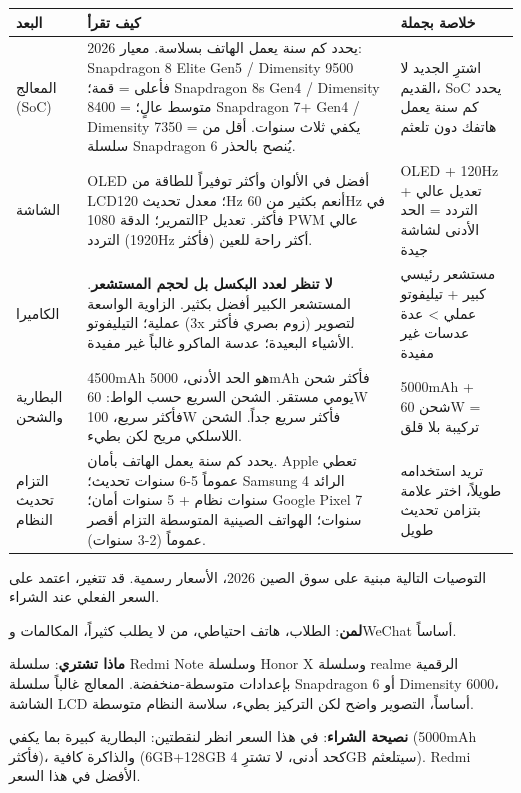\begin{center}
\begin{tabularx}{\linewidth}{|X|X|X|}
\hline
\textbf{البعد} & \textbf{كيف تقرأ} & \textbf{خلاصة بجملة} \tabularnewline
\hline
المعالج (SoC) & يحدد كم سنة يعمل الهاتف بسلاسة. معيار 2026: Snapdragon 8 Elite Gen5 / Dimensity 9500 فأعلى = قمة؛ Snapdragon 8s Gen4 / Dimensity 8400 = متوسط عالٍ؛ Snapdragon 7+ Gen4 / Dimensity 7350 = يكفي ثلاث سنوات. أقل من سلسلة Snapdragon 6 يُنصح بالحذر. & اشترِ الجديد لا القديم، SoC يحدد كم سنة يعمل هاتفك دون تلعثم \tabularnewline
الشاشة & OLED أفضل في الألوان وأكثر توفيراً للطاقة من LCD؛ معدل تحديث 120Hz أنعم بكثير من 60Hz في التمرير؛ الدقة 1080P فأكثر. تعديل PWM عالي التردد (1920Hz فأكثر) أكثر راحة للعين. & OLED + 120Hz + تعديل عالي التردد = الحد الأدنى لشاشة جيدة \tabularnewline
الكاميرا & \textbf{لا تنظر لعدد البكسل بل لحجم المستشعر}. المستشعر الكبير أفضل بكثير. الزاوية الواسعة عملية؛ التيليفوتو (3x زوم بصري فأكثر) لتصوير الأشياء البعيدة؛ عدسة الماكرو غالباً غير مفيدة. & مستشعر رئيسي كبير + تيليفوتو عملي > عدة عدسات غير مفيدة \tabularnewline
البطارية والشحن & 4500mAh هو الحد الأدنى، 5000mAh فأكثر شحن يومي مستقر. الشحن السريع حسب الواط: 60W فأكثر سريع، 100W فأكثر سريع جداً. الشحن اللاسلكي مريح لكن بطيء. & 5000mAh + شحن 60W = تركيبة بلا قلق \tabularnewline
التزام تحديث النظام & يحدد كم سنة يعمل الهاتف بأمان. Apple تعطي عموماً 5-6 سنوات تحديث؛ Samsung الرائد 4 سنوات نظام + 5 سنوات أمان؛ Google Pixel 7 سنوات؛ الهواتف الصينية المتوسطة التزام أقصر عموماً (2-3 سنوات). & تريد استخدامه طويلاً، اختر علامة بتزامن تحديث طويل \tabularnewline
\hline
\end{tabularx}
\end{center}


التوصيات التالية مبنية على سوق الصين 2026، الأسعار رسمية. قد تتغير، اعتمد على السعر الفعلي عند الشراء.


\textbf{لمن}: الطلاب، هاتف احتياطي، من لا يطلب كثيراً، المكالمات وWeChat أساساً.

\textbf{ماذا تشتري}: سلسلة Redmi Note وسلسلة Honor X وسلسلة realme الرقمية بإعدادات متوسطة-منخفضة. المعالج غالباً سلسلة Snapdragon 6 أو Dimensity 6000، الشاشة LCD أساساً، التصوير واضح لكن التركيز بطيء، سلاسة النظام متوسطة.

\textbf{نصيحة الشراء}: في هذا السعر انظر لنقطتين: البطارية كبيرة بما يكفي (5000mAh فأكثر)، والذاكرة كافية (6GB+128GB كحد أدنى، لا تشترِ 4GB سيتلعثم). Redmi الأفضل في هذا السعر.

